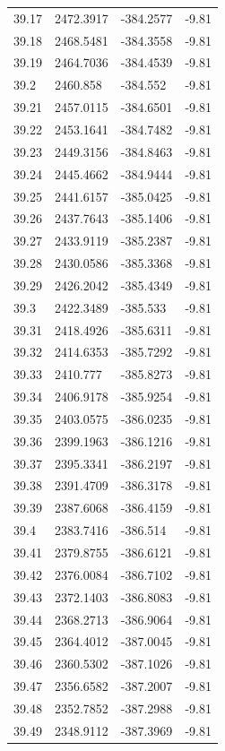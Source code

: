\begin{table}[H]
\begin{tabular}{llll}
39.17 & 2472.3917 & -384.2577 & -9.81 \\
39.18 & 2468.5481 & -384.3558 & -9.81 \\
39.19 & 2464.7036 & -384.4539 & -9.81 \\
39.2 & 2460.858 & -384.552 & -9.81 \\
39.21 & 2457.0115 & -384.6501 & -9.81 \\
39.22 & 2453.1641 & -384.7482 & -9.81 \\
39.23 & 2449.3156 & -384.8463 & -9.81 \\
39.24 & 2445.4662 & -384.9444 & -9.81 \\
39.25 & 2441.6157 & -385.0425 & -9.81 \\
39.26 & 2437.7643 & -385.1406 & -9.81 \\
39.27 & 2433.9119 & -385.2387 & -9.81 \\
39.28 & 2430.0586 & -385.3368 & -9.81 \\
39.29 & 2426.2042 & -385.4349 & -9.81 \\
39.3 & 2422.3489 & -385.533 & -9.81 \\
39.31 & 2418.4926 & -385.6311 & -9.81 \\
39.32 & 2414.6353 & -385.7292 & -9.81 \\
39.33 & 2410.777 & -385.8273 & -9.81 \\
39.34 & 2406.9178 & -385.9254 & -9.81 \\
39.35 & 2403.0575 & -386.0235 & -9.81 \\
39.36 & 2399.1963 & -386.1216 & -9.81 \\
39.37 & 2395.3341 & -386.2197 & -9.81 \\
39.38 & 2391.4709 & -386.3178 & -9.81 \\
39.39 & 2387.6068 & -386.4159 & -9.81 \\
39.4 & 2383.7416 & -386.514 & -9.81 \\
39.41 & 2379.8755 & -386.6121 & -9.81 \\
39.42 & 2376.0084 & -386.7102 & -9.81 \\
39.43 & 2372.1403 & -386.8083 & -9.81 \\
39.44 & 2368.2713 & -386.9064 & -9.81 \\
39.45 & 2364.4012 & -387.0045 & -9.81 \\
39.46 & 2360.5302 & -387.1026 & -9.81 \\
39.47 & 2356.6582 & -387.2007 & -9.81 \\
39.48 & 2352.7852 & -387.2988 & -9.81 \\
39.49 & 2348.9112 & -387.3969 & -9.81 \\

\end{tabular}
\end{table}
